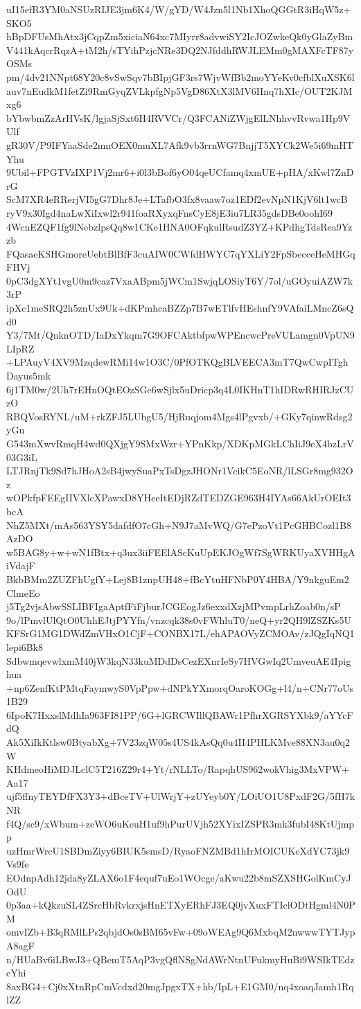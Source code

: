 uI15efR3YM0aNSUzRIJE3jm6K4/W/gYD/W4Jzn5l1Nb1XhoQGGtR3iHqW5z+SKO5
hBpDFUsMhAtx3jCqpZm5xiciaN64xc7MIyrr8advwiSY2IcJOZwkeQk0yGlaZyBm
V441kAqcrRqzA+tM2h/sTYihPzjcNRe3DQ2NJfddhRWJLEMm0gMAXFcTF87yOSMs
pm/4dv21NNpt68Y20c8vSwSqv7bBIpjGF3rs7WjvWfBb2moYYeKv0cfblXuXSK6l
auv7nEudkM1fetZi9RmGyqZVLkpfgNp5VgD86XtX3lMV6Hnq7hXIc/OUT2KJMxg6
bYbwbmZzArHVsK/lgjaSjSxt6H4RVVCr/Q3FCANiZWjgElLNhhvvRvwa1Hp9VUlf
gR30V/P9IFYaaSde2mnOEX0muXL7Afk9vb3rrnWG7BnjjT5XYCk2We5i69mHTYhu
9Ubil+FPGTVzIXP1Vj2mr6+i0l3bBof6yO04qeUCfamq4xmUE+pHA/xKwl7ZnDrG
ScM7XR4eRRerjVI5gG7Dhr8Je+LTafbO3fx8vaaw7oz1EDf2evNpN1KjV6lt1wcB
ryV9x30Igd4naLwXiIxwl2r941foaRXyxqFnsCyE8jE3iu7LR35gdsDBe0oohI69
4WcnEZQF1fg9lNebzlpsQq8w1CKe1HNA0OFqkulRsudZ3YZ+KPdhgTdsRea9Yzzb
FQasaeKSHGmoreUebtBlBfF3cuAIW0CWfdHWYC7qYXLiY2FpSbecceHeMHGqFHVj
0pC3dgXYt1vgU0m9caz7VxaABpm5jWCm1SwjqLOSiyT6Y/7ol/uGOyuiAZW7k3rP
ipXc1meSRQ2h5znUx9Uk+dKPmhcaBZZp7B7wETlfvHEshnfY9VAfaiLMncZ6sQd0
Y3/7Mt/QnknOTD/IaDxYkqm7G9OFCAktbfpwWPEncwcPreVULamgn0VpUN9LIpRZ
+LPAuyV4XV9MzqdewRMi14w1O3C/0PfOTKQgBLVEECA3mT7QwCwpITghDayus5mk
6j1TM0w/2Uh7rEHnOQtEOzSGe6wSjlx5uDricp3q4L0IKHnT1hIDRwRHIRJzCUzO
RBQVosRYNL/uM+rkZFJ5LUbgU5/HjRuqjom4Mgs4lPgvxb/+GKy7qinwRdsg2yGu
G543mXwvRmqH4wd0QXjgY9SMxWzr+YPnKkp/XDKpMGkLChIiJ9eX4bzLrV03G3iL
LTJRnjTk9Sd7hJHoA2sB4jwySuaPxTsDgzJHONr1VcikC5EoNR/lLSGr8mg932Oz
wOPkfpFEEgIIVXlcXPawxD8YHeeItEDjRZdTEDZGE963H4IYAs66AkUrOEIt3bcA
NhZ5MXt/mAs563YSY5dafdfO7cGh+N9J7aMvWQ/G7ePzoVt1PcGHBCozl1B8AzDO
w5BAG8y+w+wN1fBtx+q3ux3iiFEElAScKuUpEKJOgWf7SgWRKUyaXVHHgAiVdajF
BkbBMm2ZUZFhUgfY+Lej8B1znpUH48+fBcYtuHFNbP0Y4HBA/Y9nkguEm2ClmeEo
j5Tg2vjsAbwSSLIBFIgaAptfFiFjburJCGEogJz6exxdXzjMPvmpLrhZoab0n/sP
9o/lPmvlUlQtO0UhhEJtjPYYfn/vnzcqk38s0vFWhluT0/neQ+yr2QH9lZSZKs5U
KFSrG1MG1DWdZmVHxO1CjF+CONBX17L/ehAPAOVyZCMOAv/zJQgIqNQ1lepi6Bk8
SdbwmqevwlxmM40jW3kqN33kuMDdDsCezEXnrIeSy7HVGwIq2UmveuAE4Ipighua
+np6ZenfKtPMtqFaymwyS0VpPpw+dNPkYXmorqOaroKOGg+l4/n+CNr77oUs1B29
6IpoK7HxxslMdhIa963FI81PP/6G+lGRCWIllQBAWr1PfhrXGRSYXbk9/aYYcFdQ
Ak5XiIkKtlsw0BtyabXg+7V23zqW05s4US4kAsQq0u4II4PHLKMve88XN3au0q2W
KHdmeoHiMDJLclC5T216Z29r4+Yt/rNLLTo/RapqhUS962wokVhig3MxVPW+Aa17
ujf5ffnyTEYDfFX3Y3+dBceTV+UlWrjY+zUYeyb0Y/LOiUO1U8PxdF2G/5fH7kNR
f4Q/sc9/xWbum+zeWO6uKeuH1uf9hPurUVjh52XYixIZSPR3mk3fubI48KtUjmpp
uzHmrWrcU1SBDmZiyy6BIUK5smsD/RyaoFNZMBd1hIrMOICUKeXdYC73jk9Vs9fe
EOdnpAdh12jda8yZLAX6o1F4equf7uEo1WOcge/aKwu22b8mSZXSHGolKmCyJOdU
0p3aa+kQkzuSL4ZSrcHbRvkrxjsHnETXyERhFJ3EQ0jvXuxFTIclODtHgml4N0PM
omvIZb+B3qRMlLPs2qbjdOs0sBM65vFw+09oWEAg9Q6MxbqM2nwwwTYTJypA8agF
n/HUaBv6iLBwJ3+QBemT5AqP3vgQflNSgNdAWrNtnUFukmyHuBi9WSIkTEdzcYhi
8axBG4+Cj0xXtnRpCmVcdxd20mgJpgxTX+hb/IpL+E1GM0/nq4xoaqJamh1RqlZZ
